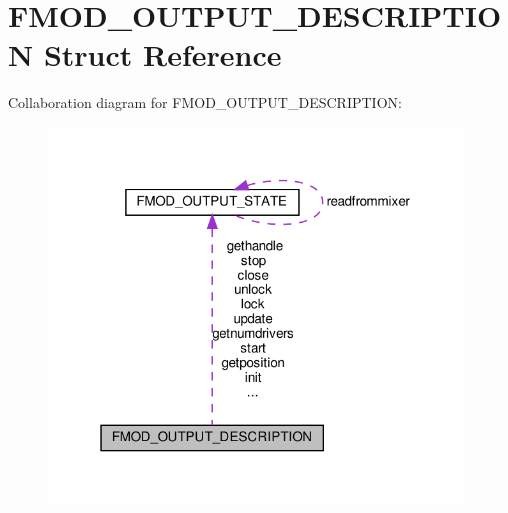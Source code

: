 \hypertarget{structFMOD__OUTPUT__DESCRIPTION}{}\section{F\+M\+O\+D\+\_\+\+O\+U\+T\+P\+U\+T\+\_\+\+D\+E\+S\+C\+R\+I\+P\+T\+I\+ON Struct Reference}
\label{structFMOD__OUTPUT__DESCRIPTION}


Collaboration diagram for F\+M\+O\+D\+\_\+\+O\+U\+T\+P\+U\+T\+\_\+\+D\+E\+S\+C\+R\+I\+P\+T\+I\+ON\+:
\nopagebreak
\begin{figure}[H]
\begin{center}
\leavevmode
\includegraphics[width=313pt]{structFMOD__OUTPUT__DESCRIPTION__coll__graph}
\end{center}
\end{figure}
